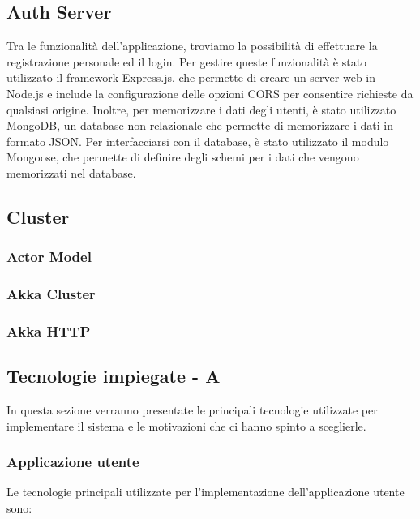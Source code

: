 \subsection{Auth Server}


Tra le funzionalità dell'applicazione, troviamo la possibilità di effettuare la
registrazione personale ed il login. Per gestire queste funzionalità è stato utilizzato
il framework Express.js, che permette di creare un server web in Node.js e include
la configurazione delle opzioni CORS per consentire richieste da qualsiasi origine.
Inoltre, per memorizzare i dati degli utenti, è stato utilizzato MongoDB,
un database non relazionale che permette di memorizzare i dati in formato JSON.
Per interfacciarsi con il database, è stato utilizzato il modulo Mongoose, che
permette di definire degli schemi per i dati che vengono memorizzati nel database.



\subsection{Cluster}
\subsubsection{Actor Model}
\subsubsection{Akka Cluster}
\subsubsection{Akka HTTP}

\subsection{Tecnologie impiegate - A}

In questa sezione verranno presentate le principali tecnologie utilizzate per implementare il sistema e le motivazioni che ci hanno spinto a sceglierle.

\subsubsection{Applicazione utente}
Le tecnologie principali utilizzate per l'implementazione dell'applicazione utente sono:

